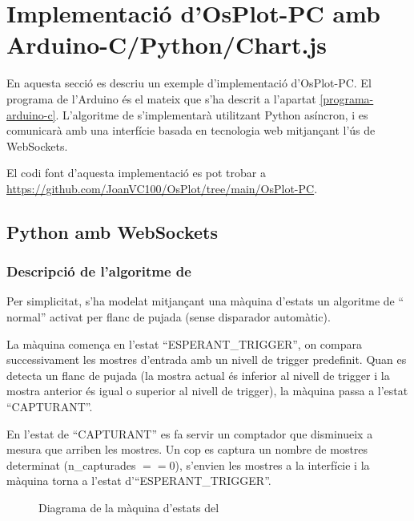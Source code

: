 \documentclass{tfgitic}[2023/06/30]
\begin{document}
\chapter{Implementació d'OsPlot-PC amb Arduino-C/Python/Chart.js}

En aquesta secció es descriu un exemple d'implementació
d'OsPlot-PC. El programa de l'Arduino és el mateix que s'ha descrit a
l'apartat \ref{programa-arduino-c}. L'algoritme de 
s'implementarà utilitzant Python asíncron, i es comunicarà amb una
interfície basada en tecnologia web mitjançant l'ús de WebSockets.

El codi font d'aquesta implementació es pot trobar a
\url{https://github.com/JoanVC100/OsPlot/tree/main/OsPlot-PC}.

\section{ Python amb WebSockets}

\subsection{Descripció de l'algoritme de }
\label{subsec:maquina-trigger}

Per simplicitat, s'ha modelat mitjançant una màquina d'estats un
algoritme de `` normal'' activat per flanc de pujada
(sense disparador automàtic).

La màquina comença en l'estat ``ESPERANT\_TRIGGER'', on compara
successivament les mostres d'entrada amb un nivell de trigger
predefinit. Quan es detecta un flanc de pujada (la mostra actual és
inferior al nivell de trigger i la mostra anterior és igual o superior
al nivell de trigger), la màquina passa a l'estat ``CAPTURANT''.

En l'estat de ``CAPTURANT'' es fa servir un comptador que disminueix a
mesura que arriben les mostres. Un cop es captura un nombre de mostres
determinat (n\_capturades $== 0$), s'envien les mostres a la
interfície i la màquina torna a l'estat d'``ESPERANT\_TRIGGER''.

\begin{figure}[!hb]
      \centering
      \caption{Diagrama de la màquina d'estats del }
\end{figure}
\end{document}

